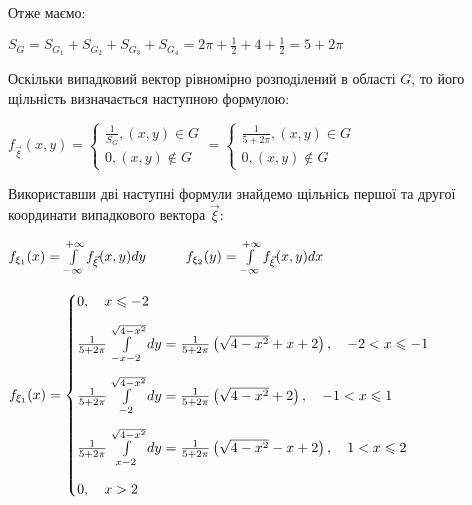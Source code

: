 \documentclass[a4paper, 20pt, titlepage]{article}
\begin{document}
\begin{spacing}{1.4}
Отже маємо:
\begin{center}
$S_{G} = S_{G_1} + S_{G_2} + S_{G_3} + S_{G_4} = 2\pi + \frac{1}{2} + 4 + \frac{1}{2} = 5 + 2\pi$
\end{center}


Оскільки випадковий вектор рівномірно розподілений в області $G$, то його щільність визначається наступною формулою:

\begin{center}
$f_{\vec{\xi}}(x,y) =
\begin{cases}
\frac{1}{S_G}, (x,y) \in G \\
0, (x,y) \notin G
\end{cases}
=
\begin{cases}
\frac{1}{5+2\pi}, (x,y) \in G \\
0, (x,y) \notin G
\end{cases}
$
\end{center}

Використавши дві наступні формули знайдемо щільнісь першої та другої координати випадкового вектора $\vec{\xi}$:
\begin{center}
$f_{\xi_1}(x) = \int \limits_{-\infty}^{+\infty} f_{\vec{\xi}}(x,y)dy \hspace{10mm} f_{\xi_2}(y) = \int \limits_{-\infty}^{+\infty} f_{\vec{\xi}}(x,y)dx$
\end{center}

$
f_{\xi_1} (x)= 
\begin{cases}
\vspace{3mm}
0, \quad x \leqslant -2 \\ \vspace{3mm}
\frac{1}{5+2\pi} \int \limits_{-x-2}^{\sqrt{4-x^2}} dy = \frac{1}{5+2\pi}\left(\sqrt{4-x^2} + x + 2 \right), \quad    -2 < x \leqslant -1 \\\vspace{3mm}
\frac{1}{5+2\pi}\int \limits_{-2}^{\sqrt{4-x^2}} dy = \frac{1}{5+2\pi} \left( \sqrt{4 - x^2} + 2 \right), \quad  -1 < x \leqslant 1 \\ \vspace{3mm} 
\frac{1}{5+2\pi}\int \limits_{x-2}^{\sqrt{4-x^2}} dy = \frac{1}{5+2\pi} \left(\sqrt{4-x^2} - x + 2 \right), \quad  1 < x \leqslant 2 \\
0, \quad x > 2
\end{cases}
$

\vspace{4mm}



\end{spacing}
\end{document}
